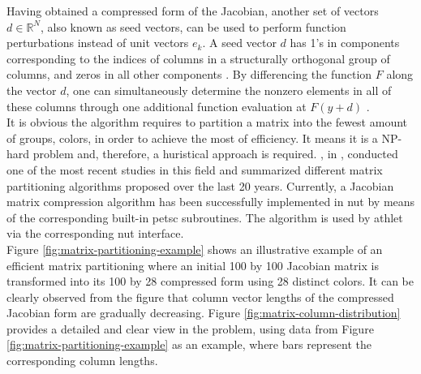 

Having obtained a compressed form of the Jacobian, another set of vectors $d \in \mathbb{R}^{N}$, also known as seed vectors, can be used to perform function perturbations instead of unit vectors $e_{k}$. A seed vector $d$ has 1’s in components corresponding to the indices of columns in a structurally orthogonal group of columns, and zeros in all other components \cite{gebremedhin2005color}. By differencing the function $F$ along the vector $d$, one can simultaneously determine the nonzero elements in all of these columns through one additional function evaluation at $F(y+d)$ \cite{gebremedhin2005color}.\\


It is obvious the algorithm requires to partition a matrix into the fewest amount of groups, colors, in order to achieve the most of efficiency. It means it is a NP-hard problem and, therefore, a huristical approach is required. \citeauthor{gebremedhin2005color}, in  \cite{gebremedhin2005color}, conducted one of the most recent studies in this field and summarized different matrix partitioning algorithms proposed over the last 20 years. Currently, a Jacobian matrix compression algorithm has been successfully implemented in \acrshort{nut} by means of the corresponding built-in \acrshort{petsc} subroutines. The algorithm is used by  \acrshort{athlet} via the corresponding \acrshort{nut} interface.\\ %


Figure \ref{fig:matrix-partitioning-example} shows an illustrative example of an efficient matrix partitioning where an initial 100 by 100 Jacobian matrix is transformed into its 100 by 28 compressed form using 28 distinct colors. It can be clearly observed from the figure that column vector lengths of the compressed Jacobian form are gradually decreasing. Figure \ref{fig:matrix-column-distribution} provides a detailed and clear view in the problem, using data from Figure \ref{fig:matrix-partitioning-example} as an example, where bars represent the corresponding column lengths.\\


